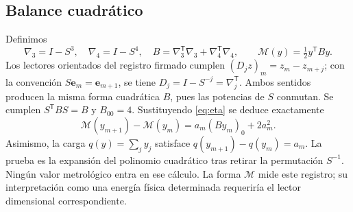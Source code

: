 \subsection{Balance cuadrático}
Definimos
\[
\nabla_3=I-S^3,\quad \nabla_4=I-S^4,\quad
B=\nabla_3^{\mathsf T}\nabla_3+\nabla_4^{\mathsf T}\nabla_4,\qquad
\mathcal M(y)=\tfrac12 y^{\mathsf T}By.
\]
Los lectores orientados del registro firmado cumplen
$(D_jz)_m=z_m-z_{m+j}$; con la convención
$S\mathbf e_m=\mathbf e_{m+1}$, se tiene
$D_j=I-S^{-j}=\nabla_j^{\mathsf T}$. Ambos sentidos producen la misma
forma cuadrática $B$, pues las potencias de $S$ conmutan.
Se cumplen $S^{\mathsf T}BS=B$ y $B_{00}=4$. Sustituyendo
\eqref{eq:eta} se deduce exactamente
\begin{equation}
\mathcal M(y_{m+1})-\mathcal M(y_m)
=a_m(By_m)_0+2a_m^2.
\label{mem:balance}
\end{equation}
Asimismo, la carga $q(y)=\sum_jy_j$ satisface
$q(y_{m+1})-q(y_m)=a_m$.
La prueba es la expansión del polinomio cuadrático tras retirar la
permutación $S^{-1}$. Ningún valor metrológico entra en ese cálculo.
La forma $\mathcal M$ mide este registro; su interpretación como una
energía física determinada requeriría el lector dimensional correspondiente.




